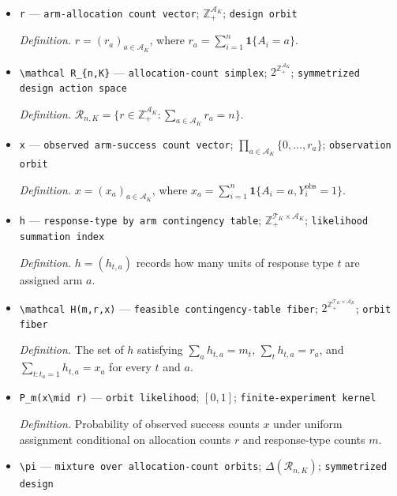 \documentclass{article}
\begin{document}
\begin{itemize}
  \item \texttt{r} --- \texttt{arm-\allowbreak{}allocation count vector}; \(\mathbb Z_+^{\mathcal A_K}\); \texttt{design orbit}
  \par\smallskip\noindent\emph{Definition.} \(r=(r_a)_{a\in\mathcal A_K}\), where \(r_a=\sum_{i=1}^n\mathbf 1\{A_i=a\}\).
  \item \texttt{\textbackslash{}\allowbreak{}mathcal R\_\allowbreak{}\{n,\allowbreak{}K\}\allowbreak{}} --- \texttt{allocation-\allowbreak{}count simplex}; \(2^{\mathbb Z_+^{\mathcal A_K}}\); \texttt{symmetrized design action space}
  \par\smallskip\noindent\emph{Definition.} \(\mathcal R_{n,K}=\{r\in\mathbb Z_+^{\mathcal A_K}:\sum_{a\in\mathcal A_K}r_a=n\}\).
  \item \texttt{x} --- \texttt{observed arm-\allowbreak{}success count vector}; \(\prod_{a\in\mathcal A_K}\{0,\ldots,r_a\}\); \texttt{observation orbit}
  \par\smallskip\noindent\emph{Definition.} \(x=(x_a)_{a\in\mathcal A_K}\), where \(x_a=\sum_{i=1}^n\mathbf 1\{A_i=a,Y_i^{\mathrm{obs}}=1\}\).
  \item \texttt{h} --- \texttt{response-\allowbreak{}type by arm contingency table}; \(\mathbb Z_+^{\mathcal T_K\times\mathcal A_K}\); \texttt{likelihood summation index}
  \par\smallskip\noindent\emph{Definition.} \(h=(h_{t,a})\) records how many units of response type \(t\) are assigned arm \(a\).
  \item \texttt{\textbackslash{}\allowbreak{}mathcal H(m,\allowbreak{}r,\allowbreak{}x)} --- \texttt{feasible contingency-\allowbreak{}table fiber}; \(2^{\mathbb Z_+^{\mathcal T_K\times\mathcal A_K}}\); \texttt{orbit fiber}
  \par\smallskip\noindent\emph{Definition.} The set of \(h\) satisfying \(\sum_a h_{t,a}=m_t\), \(\sum_t h_{t,a}=r_a\), and \(\sum_{t:t_a=1}h_{t,a}=x_a\) for every \(t\) and \(a\).
  \item \texttt{P\_\allowbreak{}m(x\textbackslash{}\allowbreak{}mid r)} --- \texttt{orbit likelihood}; \([0,1]\); \texttt{finite-\allowbreak{}experiment kernel}
  \par\smallskip\noindent\emph{Definition.} Probability of observed success counts \(x\) under uniform assignment conditional on allocation counts \(r\) and response-type counts \(m\).
  \item \texttt{\textbackslash{}\allowbreak{}pi} --- \texttt{mixture over allocation-\allowbreak{}count orbits}; \(\Delta(\mathcal R_{n,K})\); \texttt{symmetrized design}

\end{itemize}
\end{document}
